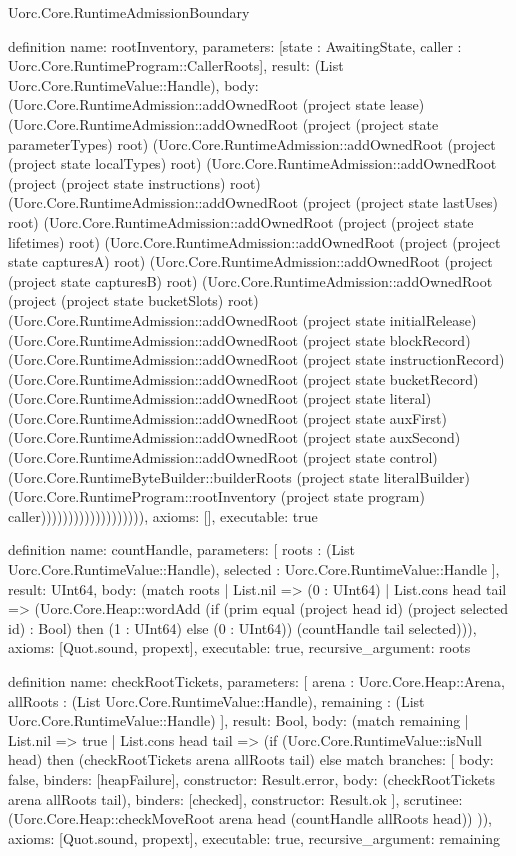 \begin{lexlean}{Uorc.Core.RuntimeAdmissionBoundary}
\begin{semanticmodule}
definition{
  name: rootInventory,
  parameters: [state : AwaitingState, caller : Uorc.Core.RuntimeProgram::CallerRoots],
  result: (List Uorc.Core.RuntimeValue::Handle),
  body: (Uorc.Core.RuntimeAdmission::addOwnedRoot (project state lease) (Uorc.Core.RuntimeAdmission::addOwnedRoot (project (project state parameterTypes) root) (Uorc.Core.RuntimeAdmission::addOwnedRoot (project (project state localTypes) root) (Uorc.Core.RuntimeAdmission::addOwnedRoot (project (project state instructions) root) (Uorc.Core.RuntimeAdmission::addOwnedRoot (project (project state lastUses) root) (Uorc.Core.RuntimeAdmission::addOwnedRoot (project (project state lifetimes) root) (Uorc.Core.RuntimeAdmission::addOwnedRoot (project (project state capturesA) root) (Uorc.Core.RuntimeAdmission::addOwnedRoot (project (project state capturesB) root) (Uorc.Core.RuntimeAdmission::addOwnedRoot (project (project state bucketSlots) root) (Uorc.Core.RuntimeAdmission::addOwnedRoot (project state initialRelease) (Uorc.Core.RuntimeAdmission::addOwnedRoot (project state blockRecord) (Uorc.Core.RuntimeAdmission::addOwnedRoot (project state instructionRecord) (Uorc.Core.RuntimeAdmission::addOwnedRoot (project state bucketRecord) (Uorc.Core.RuntimeAdmission::addOwnedRoot (project state literal) (Uorc.Core.RuntimeAdmission::addOwnedRoot (project state auxFirst) (Uorc.Core.RuntimeAdmission::addOwnedRoot (project state auxSecond) (Uorc.Core.RuntimeAdmission::addOwnedRoot (project state control) (Uorc.Core.RuntimeByteBuilder::builderRoots (project state literalBuilder) (Uorc.Core.RuntimeProgram::rootInventory (project state program) caller))))))))))))))))))),
  axioms: [],
  executable: true
}

definition{
  name: countHandle,
  parameters: [
    roots : (List Uorc.Core.RuntimeValue::Handle),
    selected : Uorc.Core.RuntimeValue::Handle
  ],
  result: UInt64,
  body: (match roots
    | List.nil => (0 : UInt64)
    | List.cons head tail => (Uorc.Core.Heap::wordAdd (if (prim equal (project head id) (project selected id) : Bool) then (1 : UInt64) else (0 : UInt64)) (countHandle tail selected))),
  axioms: [Quot.sound, propext],
  executable: true,
  recursive_argument: roots
}

definition{
  name: checkRootTickets,
  parameters: [
    arena : Uorc.Core.Heap::Arena,
    allRoots : (List Uorc.Core.RuntimeValue::Handle),
    remaining : (List Uorc.Core.RuntimeValue::Handle)
  ],
  result: Bool,
  body: (match remaining
    | List.nil => true
    | List.cons head tail => (if (Uorc.Core.RuntimeValue::isNull head) then (checkRootTickets arena allRoots tail) else match{
      branches: [
        {body: false, binders: [heapFailure], constructor: Result.error},
        {body: (checkRootTickets arena allRoots tail), binders: [checked], constructor: Result.ok}
      ],
      scrutinee: (Uorc.Core.Heap::checkMoveRoot arena head (countHandle allRoots head))
    })),
  axioms: [Quot.sound, propext],
  executable: true,
  recursive_argument: remaining
}


\end{semanticmodule}
\end{lexlean}
